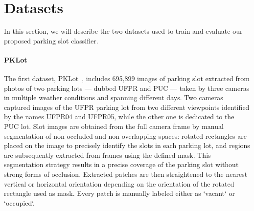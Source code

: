 \section{Datasets}
\label{sec:mini:datasets}

In this section, we will describe the two datasets used to train and evaluate our proposed parking slot classifier.

\paragraph{PKLot}
The first dataset, PKLot~\cite{de2015pklot}, includes 695,899 images of parking slot extracted from photos of two parking lots --- dubbed UFPR and PUC --- taken by three cameras in multiple weather conditions and spanning different days.
Two cameras captured images of the UFPR parking lot from two different viewpoints identified by the names UFPR04 and UFPR05, while the other one is dedicated to the PUC lot.
Slot images are obtained from the full camera frame by manual segmentation of non-occluded and non-overlapping spaces: rotated rectangles are placed on the image to precisely identify the slots in each parking lot, and regions are subsequently extracted from frames using the defined mask.
This segmentation strategy results in a precise coverage of the parking slot without strong forms of occlusion.
Extracted patches are then straightened to the nearest vertical or horizontal orientation depending on the orientation of the rotated rectangle used as mask.
Every patch is manually labeled either as `vacant` or `occupied`.


